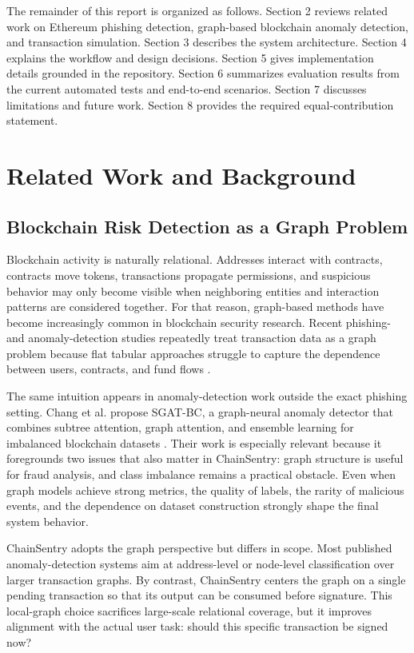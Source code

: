 \documentclass[11pt]{article}
\begin{document}
The remainder of this report is organized as follows. Section 2 reviews related work on Ethereum phishing detection, graph-based blockchain anomaly detection, and transaction simulation. Section 3 describes the system architecture. Section 4 explains the workflow and design decisions. Section 5 gives implementation details grounded in the repository. Section 6 summarizes evaluation results from the current automated tests and end-to-end scenarios. Section 7 discusses limitations and future work. Section 8 provides the required equal-contribution statement.

\section{Related Work and Background}

\subsection{Blockchain Risk Detection as a Graph Problem}

Blockchain activity is naturally relational. Addresses interact with contracts, contracts move tokens, transactions propagate permissions, and suspicious behavior may only become visible when neighboring entities and interaction patterns are considered together. For that reason, graph-based methods have become increasingly common in blockchain security research. Recent phishing- and anomaly-detection studies repeatedly treat transaction data as a graph problem because flat tabular approaches struggle to capture the dependence between users, contracts, and fund flows \cite{chen2024dahgnn,chang2025anomalous}.

The same intuition appears in anomaly-detection work outside the exact phishing setting. Chang et al. propose SGAT-BC, a graph-neural anomaly detector that combines subtree attention, graph attention, and ensemble learning for imbalanced blockchain datasets \cite{chang2025anomalous}. Their work is especially relevant because it foregrounds two issues that also matter in ChainSentry: graph structure is useful for fraud analysis, and class imbalance remains a practical obstacle. Even when graph models achieve strong metrics, the quality of labels, the rarity of malicious events, and the dependence on dataset construction strongly shape the final system behavior.

ChainSentry adopts the graph perspective but differs in scope. Most published anomaly-detection systems aim at address-level or node-level classification over larger transaction graphs. By contrast, ChainSentry centers the graph on a single pending transaction so that its output can be consumed before signature. This local-graph choice sacrifices large-scale relational coverage, but it improves alignment with the actual user task: should this specific transaction be signed now?
\end{document}
